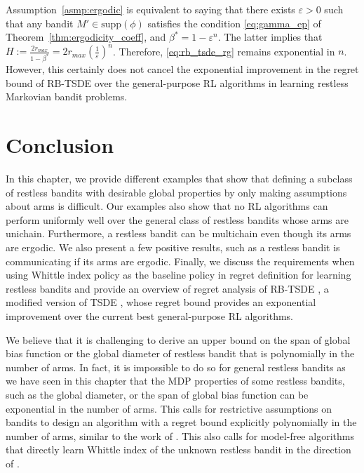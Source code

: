Assumption~\ref{asmp:ergodic} is equivalent to saying that there exists $\varepsilon>0$ such that any bandit $M'\in\mathrm{supp}(\phi)$ satisfies the condition \eqref{eq:gamma_ep} of Theorem~\ref{thm:ergodicity_coeff}, and $\beta^*=1-\varepsilon^n$.
The latter implies that $H:=\displaystyle\frac{2r_{max}}{1-\beta^*}=\displaystyle2r_{max}\left(\frac{1}{\varepsilon}\right)^n$.
Therefore, \eqref{eq:rb_tsde_rg} remains exponential in $n$.
However, this certainly does not cancel the exponential improvement in the regret bound of RB-TSDE \cite{akbarzadeh2022learning} over the general-purpose RL algorithms in learning restless Markovian bandit problems.

\section{Conclusion}
\label{ch:restless:sec:conclude}

In this chapter, we provide different examples that show that defining a subclass of restless bandits with desirable global properties by only making assumptions about arms is difficult. Our examples also show that no RL algorithms can perform uniformly well over the general class of restless bandits whose arms are unichain.
Furthermore, a restless bandit can be multichain even though its arms are ergodic.
We also present a few positive results, such as a restless bandit is communicating if its arms are ergodic.
Finally, we discuss the requirements when using Whittle index policy as the baseline policy in regret definition for learning restless bandits and provide an overview of regret analysis of RB-TSDE \cite{akbarzadeh2022learning}, a modified version of TSDE \cite{ouyang2017learning}, whose regret bound provides an exponential improvement over the current best general-purpose RL algorithms.

We believe that it is challenging to derive an upper bound on the span of global bias function or the global diameter of restless bandit that is polynomially in the number of arms.
In fact, it is impossible to do so for general restless bandits as we have seen in this chapter that the MDP properties of some restless bandits, such as the global diameter, or the span of global bias function can be exponential in the number of arms.
This calls for restrictive assumptions on bandits to design an algorithm with a regret bound explicitly polynomially in the number of arms, similar to the work of \cite{wang2020restless}.
This also calls for model-free algorithms that directly learn Whittle index of the unknown restless bandit in the direction of \cite{fu2019towards, gibson2021novel, nakhleh2021neurwin, avrachenkov2022whittle}.

